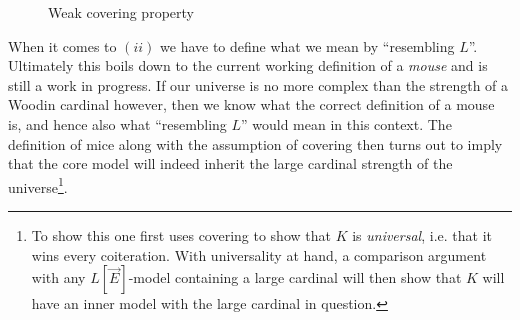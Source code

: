 \documentclass[../../main]{subfiles}
\begin{document}
\begin{center}
  \begin{figure}
    \caption{Weak covering property}
  \end{figure}
\end{center}

\qquad When it comes to $(ii)$ we have to define what we mean by ``resembling $L$''. Ultimately this boils down to the current working definition of a \textit{mouse} and is still a work in progress. If our universe is no more complex than the strength of a Woodin cardinal however, then we know what the correct definition of a mouse is, and hence also what ``resembling $L$'' would mean in this context. The definition of mice along with the assumption of covering then turns out to imply that the core model will indeed inherit the large cardinal strength of the universe\footnote{To show this one first uses covering to show that $K$ is \textit{universal}, i.e. that it wins every coiteration. With universality at hand, a comparison argument with any $L[\vec E]$-model containing a large cardinal will then show that $K$ will have an inner model with the large cardinal in question.}.
\end{document}
